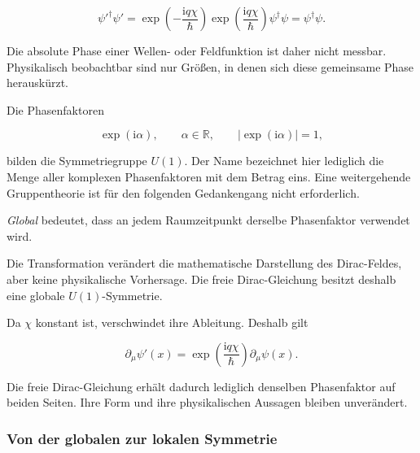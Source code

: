 \begin{equation*}
	\psi'^{\dagger}\psi'
	=
	\exp\left(-\frac{\mathrm{i}q\chi}{\hbar}\right)
	\exp\left(\frac{\mathrm{i}q\chi}{\hbar}\right)
	\psi^{\dagger}\psi
	=
	\psi^{\dagger}\psi.
\end{equation*}

Die absolute Phase einer Wellen- oder Feldfunktion ist daher nicht
messbar. Physikalisch beobachtbar sind nur Größen, in denen sich diese
gemeinsame Phase herauskürzt.

Die Phasenfaktoren

\begin{equation*}
	\exp(\mathrm{i}\alpha),
	\qquad
	\alpha\in\mathbb{R},
	\qquad
	\left|\exp(\mathrm{i}\alpha)\right|=1,
\end{equation*}

bilden die Symmetriegruppe \(U(1)\). Der Name
bezeichnet hier lediglich die Menge aller komplexen Phasenfaktoren mit
dem Betrag eins. Eine weitergehende Gruppentheorie ist für den
folgenden Gedankengang nicht erforderlich.

\begin{DidacticBox}
	\label{box:globale_u1_symmetrie_qed}

	\emph{Global} bedeutet, dass an jedem Raumzeitpunkt derselbe
	Phasenfaktor verwendet wird.

	Die Transformation verändert die mathematische Darstellung des
	Dirac-Feldes, aber keine physikalische Vorhersage. Die freie
	Dirac-Gleichung besitzt deshalb eine globale
	\(U(1)\)-Symmetrie.
\end{DidacticBox}

Da \(\chi\) konstant ist, verschwindet ihre Ableitung. Deshalb gilt

\begin{equation}
	\partial_\mu\psi'(x)
	=
	\exp\left(
	\frac{\mathrm{i}q\chi}{\hbar}
	\right)
	\partial_\mu\psi(x).
	\label{eq:ableitung_globale_phase_qed}
\end{equation}

Die freie Dirac-Gleichung erhält dadurch lediglich denselben
Phasenfaktor auf beiden Seiten. Ihre Form und ihre physikalischen
Aussagen bleiben unverändert.

\subsubsection*{Von der globalen zur lokalen Symmetrie}

